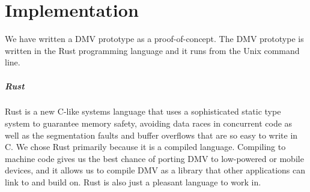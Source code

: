 \chapter{Implementation}

We have written a DMV prototype as a proof-of-concept. The DMV prototype is
written in the Rust programming language and it runs from the Unix command line.


\paragraph{Rust}

Rust is a new C-like systems language that uses a sophisticated static type
system to guarantee memory safety, avoiding data races in concurrent code as
well as the segmentation faults and buffer overflows that are so easy to write
in C. We chose Rust primarily because it is a compiled language. Compiling to
machine code gives us the best chance of porting DMV to low-powered or mobile
devices, and it allows us to compile DMV as a library that other applications
can link to and build on. Rust is also just a pleasant language to work in.






